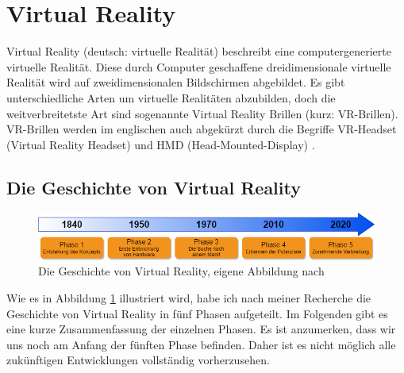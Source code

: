 \section{Virtual Reality}\label{sec:VR}
Virtual Reality (deutsch: virtuelle Realität) beschreibt eine computergenerierte virtuelle Realität. Diese durch Computer geschaffene dreidimensionale virtuelle Realität wird auf zweidimensionalen Bildschirmen abgebildet. Es gibt unterschiedliche Arten um virtuelle Realitäten abzubilden, doch die weitverbreitetste Art sind sogenannte Virtual Reality Brillen (kurz: VR-Brillen). VR-Brillen werden im englischen auch abgekürzt durch die Begriffe VR-Headset (Virtual Reality Headset) und HMD (Head-Mounted-Display) \cite{19}.

\subsection{Die Geschichte von Virtual Reality}\label{sec:VRGeschichte}
\begin{figure}[h]
	\centering
	\includegraphics[width=1\linewidth]{Bilder/A12_GeschichteVR}
	\caption{Die Geschichte von Virtual Reality, eigene Abbildung nach \cite{20,21,22,23}}
	\label{fig:GeschichteVR}
\end{figure}
\noindent Wie es in Abbildung \ref{fig:GeschichteVR} illustriert wird, habe ich nach meiner Recherche die Geschichte von Virtual Reality in fünf Phasen aufgeteilt. Im Folgenden gibt es eine kurze Zusammenfassung der einzelnen Phasen. Es ist anzumerken, dass wir uns noch am Anfang der fünften Phase befinden. Daher ist es nicht möglich alle zukünftigen Entwicklungen vollständig vorherzusehen.

